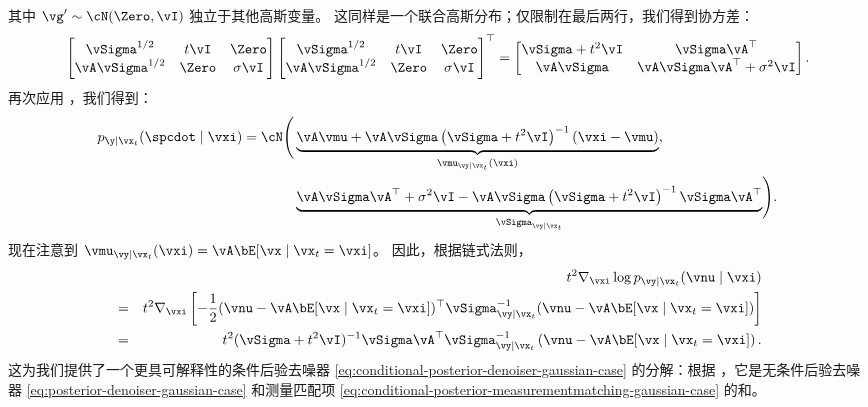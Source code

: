 \documentclass[../../book-main_zh.tex]{subfiles}
\begin{document}
\begin{example}
\begin{equation}
    \end{equation}
    其中 $\vg' \sim \cN(\Zero, \vI)$ 独立于其他高斯变量。
    这同样是一个联合高斯分布；仅限制在最后两行，我们得到协方差：
    \begin{equation*}
        \begin{bmatrix}
            \vSigma^{1/2} & t\vI & \Zero \\
            \vA \vSigma^{1/2} & \Zero & \sigma \vI
        \end{bmatrix}
        \begin{bmatrix}
            \vSigma^{1/2} & t\vI & \Zero \\
            \vA \vSigma^{1/2} & \Zero & \sigma \vI
        \end{bmatrix}^\top
        =
        \begin{bmatrix}
            \vSigma + t^2\vI & \vSigma\vA^\top \\
            \vA\vSigma & \vA\vSigma\vA^\top + \sigma^2 \vI
        \end{bmatrix}.
    \end{equation*}
    再次应用 ，我们得到：
    \begin{equation}
        \begin{split}
            p_{\y \mid \vx_t}(\spcdot \mid \vxi) = \cN\Biggl(
                &\underbrace{%
                    \vA\vmu + \vA\vSigma\left( \vSigma + t^2 \vI \right)^{-1}
                    \left(
                        \vxi - \vmu
                    \right)
                }_{\vmu_{\vy \mid \vx_t}(\vxi)}, \\
                &\underbrace{%
                    \vA\vSigma\vA^\top + \sigma^2 \vI - \vA\vSigma
                    \left( \vSigma
                    + t^2 \vI\right)^{-1} \vSigma \vA^\top
                }_{\vSigma_{\vy\mid \vx_t}}
            \Biggr).
        \end{split}
    \end{equation}
    现在注意到 $\vmu_{\vy \mid \vx_t}(\vxi) = \vA \bE[\vx \mid
    \vx_t=\vxi]$。
    因此，根据链式法则，
    \begin{eqnarray}
        &&t^2 \nabla_{\vxi} \log p_{\vy \mid \vx_t}(\vnu \mid \vxi)\nonumber \\
        &=&
        t^2 \nabla_{\vxi}\left[
            -\frac{1}{2}
            (\vnu - \vA \bE[\vx \mid \vx_t=\vxi])^\top
            \vSigma_{\vy \mid \vx_t}^{-1}
            (\vnu - \vA \bE[\vx \mid \vx_t=\vxi])
        \right]\nonumber
        \\
        &=& t^2 (\vSigma+t^2 \vI)^{-1}\vSigma\vA^\top\vSigma_{\vy \mid
        \vx_t}^{-1}\left(
        \vnu - \vA \bE[\vx \mid \vx_t=\vxi] \right).
        \label{eq:conditional-posterior-measurementmatching-gaussian-case}
    \end{eqnarray}
    这为我们提供了一个更具可解释性的条件后验去噪器 \eqref{eq:conditional-posterior-denoiser-gaussian-case} 的分解：根据 ，它是无条件后验去噪器 \eqref{eq:posterior-denoiser-gaussian-case} 和测量匹配项 \eqref{eq:conditional-posterior-measurementmatching-gaussian-case} 的和。


\end{example}
\end{document}
